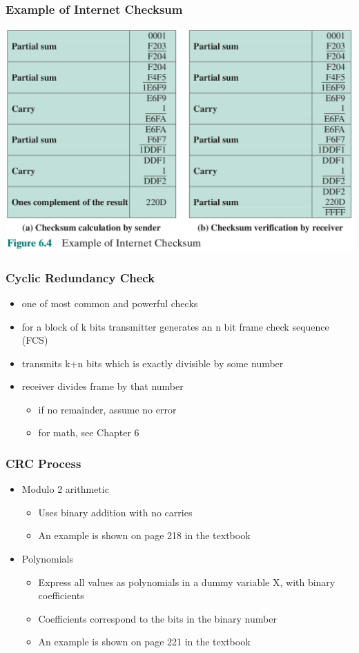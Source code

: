 \documentclass[pdflatex,compress]{beamer}
\begin{document}
\begin{frame}
	\frametitle{Example of Internet Checksum}
	\begin{center}
		\includegraphics[width=\linewidth]{img/img04}
	\end{center}
\end{frame}

\begin{frame}
	\frametitle{Cyclic Redundancy Check}
	\begin{itemize}
		\item one of most common and powerful checks
		\item for a block of k bits transmitter generates an n bit frame check sequence (FCS)
		\item transmits k+n bits which is exactly divisible by some number
		\item receiver divides frame by that number
		\begin{itemize}
			\item if no remainder, assume no error
			\item for math, see Chapter 6
		\end{itemize}
	\end{itemize}
\end{frame}

\begin{frame}
	\frametitle{CRC Process}
	\begin{itemize}
		\item Modulo 2 arithmetic
		\begin{itemize}
			\item Uses binary addition with no carries
			\item An example is shown on page 218 in the textbook
		\end{itemize}
		\item Polynomials
		\begin{itemize}
			\item Express all values as polynomials
			in a dummy variable X, with
			binary coefficients
			\item Coefficients correspond to the bits in the binary number
			\item An example is shown on page 221 in the textbook
		\end{itemize}
	\end{itemize}
\end{frame}
\end{document}
